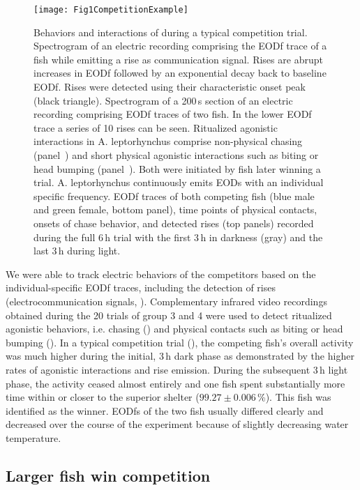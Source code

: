 \begin{figure}[ht!]
  \centerline{\texttt{[image: Fig1CompetitionExample]}}
  \caption{\label{trial} Behaviors and interactions of \Lepto{} during a typical competition trial.  Spectrogram of an electric recording comprising the EODf trace of a fish while emitting a rise as communication signal. Rises are abrupt increases in EODf followed by an exponential decay back to baseline EODf. Rises were detected using their characteristic onset peak (black triangle).  Spectrogram of a 200\,s section of an electric recording comprising EODf traces of two fish. In the lower EODf trace a series of 10 rises can be seen.  Ritualized agonistic interactions in A. leptorhynchus comprise non-physical chasing (panel~) and short physical agonistic interactions such as biting or head bumping (panel~). Both were initiated by fish later winning a trial.  A. leptorhynchus continuously emits EODs with an individual specific frequency. EODf traces of both competing fish (blue male and green female, bottom panel), time points of physical contacts, onsets of chase behavior, and detected rises (top panels) recorded during the full 6\,h trial with the first 3\,h in darkness (gray) and the last 3\,h during light.}
\end{figure}

We were able to track electric behaviors of the competitors based on the individual-specific EODf traces, including the detection of rises (electrocommunication signals, ). Complementary infrared video recordings obtained during the 20 trials of group 3 and 4 were used to detect ritualized agonistic behaviors, i.e. chasing () and physical contacts such as biting or head bumping (). In a typical competition trial (), the competing fish's overall activity was much higher during the initial, 3\,h dark phase as demonstrated by the higher rates of agonistic interactions and rise emission. During the subsequent 3\,h light phase, the activity ceased almost entirely and one fish spent substantially more time within or closer to the superior shelter ($99.27 \pm 0.006$\,\%). This fish was identified as the winner. EODfs of the two fish usually differed clearly and decreased over the course of the experiment because of slightly decreasing water temperature.

\subsection{Larger fish win competition}

